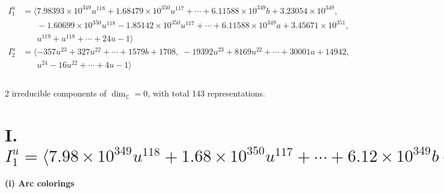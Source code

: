 \documentclass[1p]{elsarticle_modified}
\theoremstyle{definition}
\begin{document}
\begin{align*}
I^u_{1}&=\langle 
7.98393\times10^{349} u^{118}+1.68479\times10^{350} u^{117}+\cdots+6.11588\times10^{349} b+3.23054\times10^{349},\\
\phantom{I^u_{1}}&\phantom{= \langle  }-1.60699\times10^{350} u^{118}-1.85142\times10^{350} u^{117}+\cdots+6.11588\times10^{349} a+3.45671\times10^{351},\\
\phantom{I^u_{1}}&\phantom{= \langle  }u^{119}+u^{118}+\cdots+24 u-1\rangle \\
I^u_{2}&=\langle 
-357 u^{23}+327 u^{22}+\cdots+1579 b+1708,\;-19392 u^{23}+8169 u^{22}+\cdots+30001 a+14942,\\
\phantom{I^u_{2}}&\phantom{= \langle  }u^{24}-16 u^{22}+\cdots+4 u-1\rangle \\
\\
\end{align*}
\raggedright * 2 irreducible components of $\dim_{\mathbb{C}}=0$, with total 143 representations.\\
\newpage
\renewcommand{\arraystretch}{1}
\centering \section*{I. $I^u_{1}= \langle 7.98\times10^{349} u^{118}+1.68\times10^{350} u^{117}+\cdots+6.12\times10^{349} b+3.23\times10^{349},\;-1.61\times10^{350} u^{118}-1.85\times10^{350} u^{117}+\cdots+6.12\times10^{349} a+3.46\times10^{351},\;u^{119}+u^{118}+\cdots+24 u-1 \rangle$}
\flushleft \textbf{(i) Arc colorings}\\
\end{document}

